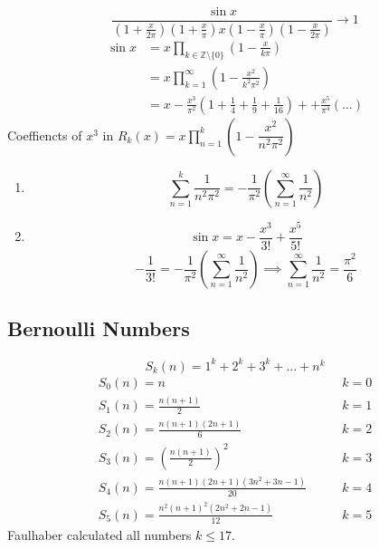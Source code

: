 \documentclass[letterpaper, 12pt]{article}
\newcommand{\Z}{\mathbb{Z}}
\newcommand{\0}{\emptyset}
\begin{document}
    \[
        \frac{\sin x}{(1+\frac{x}{2\pi})(1+\frac{x}{\pi})x(1-\frac{x}{\pi})(1-\frac{x}{2\pi})}
        \to 1
    \]
    \begin{align*}
        \sin x &= x \prod_{k \in \Z\setminus\{0\}} \left(1 - \frac{x}{k\pi}\right) \\
        &= x \prod_{k = 1}^{\infty} \left(1 - \frac{x^2}{k^2\pi^2}\right) \\
        &= x - \frac{x^3}{\pi^2} (1 + \frac{1}{4} + \frac{1}{9} + \frac{1}{16}) + 
        + \frac{x^5}{\pi^4}(\dots)
    \end{align*}
    Coeffiencts of $x^3$ in $R_k(x) = x \prod_{n=1}^{k} \left(1 - \dfrac{x^2}{n^2\pi^2}\right)$
    \begin{enumerate}
        \item \[\sum_{n=1}^{k}\frac{1}{n^2\pi^2}
        = -\frac{1}{\pi^2}\left(\sum_{n=1}^{\infty}\frac{1}{n^2}\right)\]
        \item \[\sin x = x - \frac{x^3}{3!} + \frac{x^5}{5!}\]
        \[-\frac{1}{3!} = -\frac{1}{\pi^2} \left(\sum_{n=1}^{\infty} \frac{1}{n^2}\right)
        \implies \sum_{n=1}^{\infty} \frac{1}{n^2} = \frac{\pi^2}{6}\]
    \end{enumerate}
    \subsection*{Bernoulli Numbers}
    \[S_k(n) = 1^k + 2^k + 3^k + \dots + n^k\]
    \begin{align*}
        S_0(n) = n &\qquad k = 0 \\
        S_1(n) = \frac{n(n+1)}{2} &\qquad k = 1 \\
        S_2(n) = \frac{n(n+1)(2n+1)}{6} &\qquad k = 2 \\
        S_3(n) = \left(\frac{n(n+1)}{2}\right)^2 &\qquad k = 3 \\
        S_4(n) = \frac{n(n+1)(2n+1)(3n^2+3n-1)}{20} &\qquad k = 4 \\
        S_5(n) = \frac{n^2(n+1)^2(2n^2+2n-1)}{12} &\qquad k = 5
    \end{align*}
    Faulhaber calculated all numbers $k \le 17$.
\end{document}
